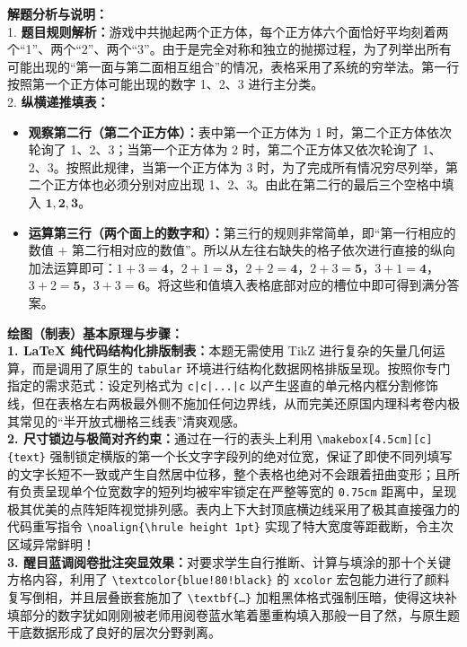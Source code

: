 \documentclass[12pt, a4paper]{ctexrep}
\begin{document}
{\small\color{gray}
\textbf{解题分析与说明：}\\
1. \textbf{题目规则解析：}游戏中共抛起两个正方体，每个正方体六个面恰好平均刻着两个“1”、两个“2”、两个“3”。由于是完全对称和独立的抛掷过程，为了列举出所有可能出现的“第一面与第二面相互组合”的情况，表格采用了系统的穷举法。第一行按照第一个正方体可能出现的数字 1、2、3 进行主分类。\\
2. \textbf{纵横递推填表：}
\begin{itemize}
    \item \textbf{观察第二行（第二个正方体）：}表中第一个正方体为 1 时，第二个正方体依次轮询了 1、2、3；当第一个正方体为 2 时，第二个正方体又依次轮询了 1、2、3。按照此规律，当第一个正方体为 3 时，为了完成所有情况穷尽列举，第二个正方体也必须分别对应出现 1、2、3。由此在第二行的最后三个空格中填入 $\boldsymbol{1, 2, 3}$。
    \item \textbf{运算第三行（两个面上的数字和）：}第三行的规则非常简单，即“第一行相应的数值 $+$ 第二行相对应的数值”。所以从左往右缺失的格子依次进行直接的纵向加法运算即可：$1+3=\boldsymbol{4}$，$2+1=\boldsymbol{3}$，$2+2=\boldsymbol{4}$，$2+3=\boldsymbol{5}$，$3+1=\boldsymbol{4}$，$3+2=\boldsymbol{5}$，$3+3=\boldsymbol{6}$。将这些和值填入表格底部对应的槽位中即可得到满分答案。
\end{itemize}
}

\vspace{0.6cm}

{\small\color{blue!70!black}
\textbf{绘图（制表）基本原理与步骤：}\\
\textbf{1. LaTeX 纯代码结构化排版制表：}本题无需使用 TikZ 进行复杂的矢量几何运算，而是调用了原生的 \texttt{tabular} 环境进行结构化数据网格排版呈现。按照你专门指定的需求范式：设定列格式为 \texttt{c|c|...|c} 以产生竖直的单元格内框分割修饰线，但在表格左右两极最外侧不施加任何边界线，从而完美还原国内理科考卷内极其常见的“半开放式栅格三线表”清爽观感。\\
\textbf{2. 尺寸锁边与极简对齐约束：}通过在一行的表头上利用 \texttt{\textbackslash makebox[4.5cm][c]\{text\}} 强制锁定横版的第一个长文字字段列的绝对位宽，保证了即使不同列填写的文字长短不一致或产生自然居中位移，整个表格也绝对不会跟着扭曲变形；且所有负责呈现单个位宽数字的短列均被牢牢锁定在严整等宽的 \texttt{0.75cm} 距离中，呈现极其优美的点阵矩阵视觉排列感。表内上下大封顶底横边线采用了极其直接强力的代码重写指令 \texttt{\textbackslash noalign\{\textbackslash hrule height 1pt\}} 实现了特大宽度等距截断，令主次区域异常鲜明！\\
\textbf{3. 醒目蓝调阅卷批注突显效果：}对要求学生自行推断、计算与填涂的那十个关键方格内容，利用了 \texttt{\textbackslash textcolor\{blue!80!black\}} 的 \texttt{xcolor} 宏包能力进行了颜料复写倒相，并且层叠嵌套施加了 \texttt{\textbackslash textbf\{\dots\}} 加粗黑体格式强制压暗，使得这块补填部分的数字犹如刚刚被老师用阅卷蓝水笔着墨重构填入那般一目了然，与原生题干底数据形成了良好的层次分野剥离。
}
\end{document}
